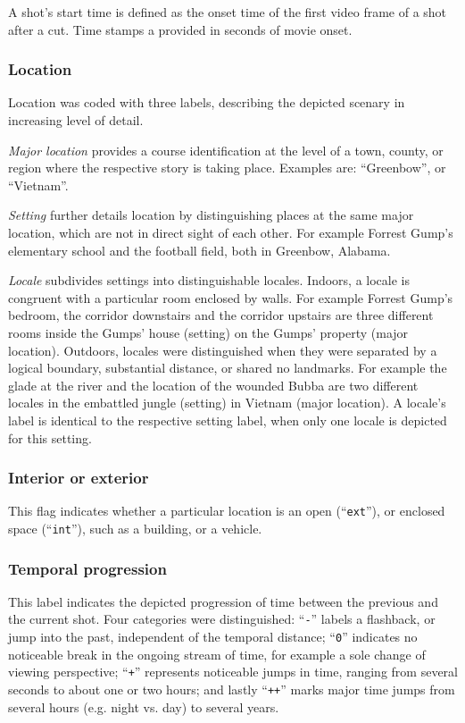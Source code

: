 \documentclass[10pt,a4paper,twocolumn]{article}
\begin{document}
A shot's start time is defined as the onset time of the first video frame of a
shot after a cut. Time stamps a provided in seconds of movie onset. 

\subsubsection*{Location}

Location was coded with three labels, describing the depicted scenary
in increasing level of detail.

\textit{Major location} provides a course identification at the level of a
town, county, or region where the respective story is taking place. Examples are:
``Greenbow'', or ``Vietnam''.

\textit{Setting} further details location by distinguishing places at the same
major location, which are not in direct sight of each other. For example
Forrest Gump's elementary school and the football field, both in Greenbow,
Alabama. 

\textit{Locale} subdivides settings into distinguishable locales.  Indoors, a
locale is congruent with a particular room enclosed by walls. For example
Forrest Gump's bedroom, the corridor downstairs and the corridor upstairs are
three different rooms inside the Gumps' house (setting) on the Gumps' property
(major location). Outdoors, locales were distinguished when they were separated
by a logical boundary, substantial distance, or shared no landmarks.  For
example the glade at the river and the location of the wounded Bubba are two
different locales in the embattled jungle (setting) in Vietnam (major
location). A locale's label is identical to the respective setting label, when
only one locale is depicted for this setting.


\subsubsection*{Interior or exterior}

This flag indicates whether a particular location is an open
(``\texttt{ext}''), or enclosed space (``\texttt{int}''), such as a building,
or a vehicle.


\subsubsection*{Temporal progression}

This label indicates the depicted progression of time between the previous and
the current shot. Four categories were distinguished: ``\texttt{-}'' labels a
flashback, or jump into the past, independent of the temporal distance;
``\texttt{0}'' indicates no noticeable break in the ongoing stream of time, for
example a sole change of viewing perspective; ``\texttt{+}'' represents
noticeable jumps in time, ranging from several seconds to about one or two
hours; and lastly ``\texttt{++}'' marks major time jumps from several hours
(e.g.  night vs. day) to several years.
\end{document}
